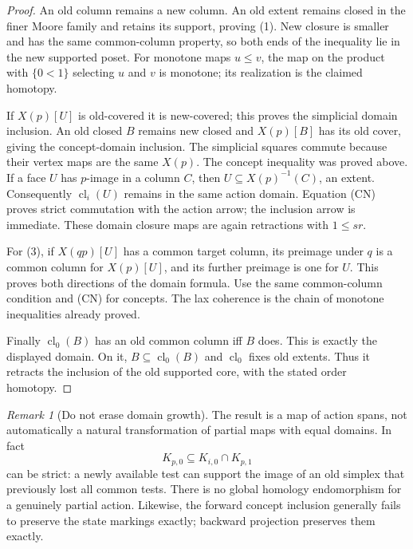 \documentclass[11pt]{article}
\theoremstyle{remark}\newtheorem{remark}[theorem]{Remark}
\newcommand{\cl}{\operatorname{cl}}
\begin{document}
\begin{proof}
An old column remains a new column. An old extent remains closed in
the finer Moore family and retains its support, proving (1). New
closure is smaller and has the same common-column property, so both
ends of the inequality lie in the new supported poset. For monotone
maps $u\leq v$, the map on the product with $\{0<1\}$ selecting
$u$ and $v$ is monotone; its realization is the claimed homotopy.

If $X(p)[U]$ is old-covered it is new-covered; this proves the
simplicial domain inclusion. An old closed $B$ remains new closed and
$X(p)[B]$ has its old cover, giving the concept-domain inclusion.
The simplicial squares commute because their vertex maps are the same
$X(p)$. The concept inequality was proved above. If a face $U$ has
$p$-image in a column $C$, then $U\subseteq X(p)^{-1}(C)$, an extent.
Consequently $\cl_i(U)$ remains in the same action domain.
Equation (CN) proves strict commutation with the action arrow; the
inclusion arrow is immediate. These domain closure maps are again
retractions with $1\leq sr$.

For (3), if $X(qp)[U]$ has a common target column, its preimage under
$q$ is a common column for $X(p)[U]$, and its further preimage is one
for $U$. This proves both directions of the domain formula. Use the
same common-column condition and (CN) for concepts. The lax coherence
is the chain of monotone inequalities already proved.

Finally $\cl_0(B)$ has an old common column iff $B$ does. This is
exactly the displayed domain. On it, $B\subseteq\cl_0(B)$ and
$\cl_0$ fixes old extents. Thus it retracts the inclusion of the old
supported core, with the stated order homotopy.
\end{proof}
\begin{remark}[Do not erase domain growth]
The result is a map of action spans, not automatically a natural
transformation of partial maps with equal domains. In fact
\[
 K_{p,0}\subseteq K_{i,0}\cap K_{p,1}
\]
can be strict: a newly available test can support the image of an old
simplex that previously lost all common tests. There is no global
homology endomorphism for a genuinely partial action. Likewise, the
forward concept inclusion generally fails to preserve the state
markings exactly; backward projection preserves them exactly.
\end{remark}
\end{document}
